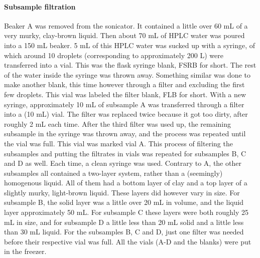 \documentclass[twocolumn,a4paper,aps,amsmath,amssymb,floatfix,superscriptaddress]{revtex4-2}
\begin{document}
	\paragraph*{Subsample filtration}
	Beaker A was removed from the sonicator. It contained a little over 60 mL of a very murky, clay-brown liquid. 
	Then about 70 mL of HPLC water was poured into a 150 mL beaker. 5 mL of this HPLC water was sucked up with a syringe, of which around 10 droplets (corresponding to approximately 200 \mu L) were transferred into a vial. This was the flask syringe blank, FSRB for short. The rest of the water inside the syringe was thrown away. Something similar was done to make another blank, this time however through a filter and excluding the first few droplets. This vial was labeled the filter blank, FLB for short.
	With a new syringe, approximately 10 mL of subsample A was transferred through a filter into a (10 mL) vial. The filter was replaced twice because it got too dirty, after roughly 2 mL each time. After the third filter was used up, the remaining subsample in the syringe was thrown away, and the process was repeated until the vial was full. This vial was marked vial A. 
	This process of filtering the subsamples and putting the filtrates in vials was repeated for subsamples B, C and D as well. Each time, a clean syringe was used. Contrary to A, the other subsamples all contained a two-layer system, rather than a (seemingly) homogenous liquid. All of them had a bottom layer of clay and a top layer of a slightly murky, light-brown liquid. These layers did however vary in size. For subsample B, the solid layer was a little over 20 mL in volume, and the liquid layer approximately 50 mL. For subsample C these layers were both roughly 25 mL in size, and for subsample D a little less than 20 mL solid and a little less than 30 mL liquid. For the subsamples B, C and D, just one filter was needed before their respective vial was full.
	All the vials (A-D and the blanks) were put in the freezer.
\end{document}
